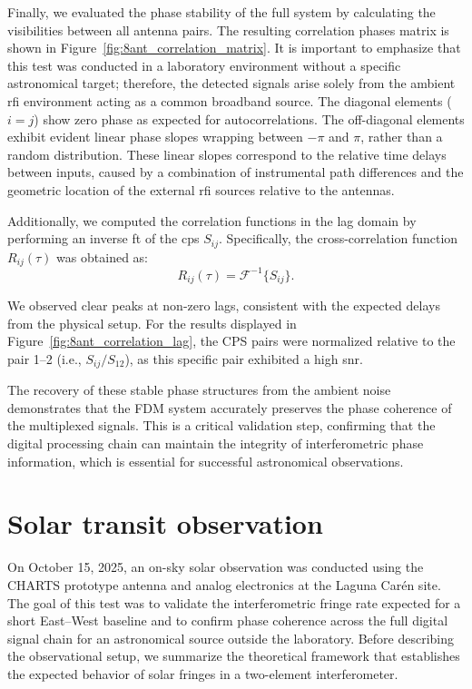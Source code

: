 Finally, we evaluated the phase stability of the full system by calculating the visibilities between all antenna pairs. The resulting correlation phases matrix is shown in Figure~\ref{fig:8ant_correlation_matrix}. It is important to emphasize that this test was conducted in a laboratory environment without a specific astronomical target; therefore, the detected signals arise solely from the ambient \gls{rfi} environment acting as a common broadband source. The diagonal elements ($i=j$) show zero phase as expected for autocorrelations. The off-diagonal elements exhibit evident linear phase slopes wrapping between $-\pi$ and $\pi$, rather than a random distribution. These linear slopes correspond to the relative time delays between inputs, caused by a combination of instrumental path differences and the geometric location of the external \gls{rfi} sources relative to the antennas. 

Additionally, we computed the correlation functions in the lag domain by performing an inverse \gls{ft} of the \gls{cps} $S_{ij}$. Specifically, the cross-correlation function $R_{ij}(\tau)$ was obtained as:
\begin{equation}
    R_{ij}(\tau) = \mathcal{F}^{-1}\{S_{ij}\} .
\end{equation}

We observed clear peaks at non-zero lags, consistent with the expected delays from the physical setup. For the results displayed in Figure~\ref{fig:8ant_correlation_lag}, the CPS pairs were normalized relative to the pair 1--2 (i.e., $S_{ij}/S_{12}$), as this specific pair exhibited a high \gls{snr}.

The recovery of these stable phase structures from the ambient noise demonstrates that the FDM system accurately preserves the phase coherence of the multiplexed signals. This is a critical validation step, confirming that the digital processing chain can maintain the integrity of interferometric phase information, which is essential for successful astronomical observations.


\section{Solar transit observation}
\label{sec:solar_transit}
On October 15, 2025, an on-sky solar observation was conducted using the CHARTS prototype antenna and analog electronics at the Laguna Carén site. The goal of this test was to validate the interferometric fringe rate expected for a short East–West baseline and to confirm phase coherence across the full digital signal chain for an astronomical source outside the laboratory. Before describing the observational setup, we summarize the theoretical framework that establishes the expected behavior of solar fringes in a two-element interferometer.

